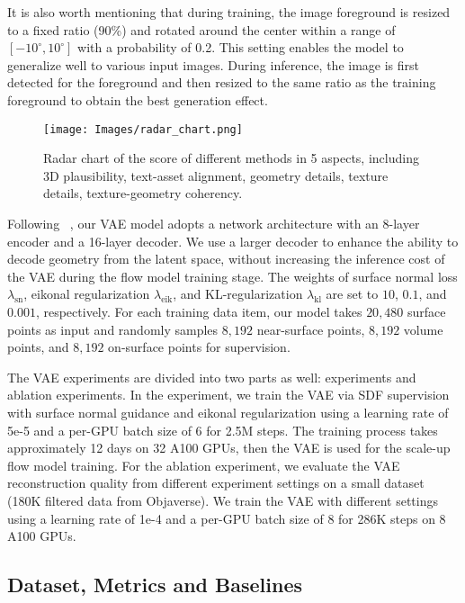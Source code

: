 It is also worth mentioning that during training, the image foreground is resized to a fixed ratio (90\%) and rotated around the center within a range of $[-10^\circ, 10^\circ]$ with a probability of 0.2. This setting enables the model to generalize well to various input images. During inference, the image is first detected for the foreground and then resized to the same ratio as the training foreground to obtain the best generation effect.

\begin{figure}[t]
    \centering
    \texttt{[image: Images/radar\_chart.png]}
    \caption{Radar chart of the score of different methods in 5 aspects, including 3D plausibility, text-asset alignment, geometry details, texture details, texture-geometry coherency.}
    \label{fig:gpteval}
    \vspace{-1em}
\end{figure}


Following ~\cite{zhao2024michelangelo}, our VAE model adopts a network architecture with an 8-layer encoder and a 16-layer decoder. We use a larger decoder to enhance the ability to decode geometry from the latent space, without increasing the inference cost of the VAE during the flow model training stage.
The weights of surface normal loss $\lambda_{\text{sn}}$, eikonal regularization $\lambda_{\text{eik}}$, and KL-regularization $\lambda_{\text{kl}}$ are set to $10$, $0.1$, and $0.001$, respectively.
For each training data item, our model takes $20,480$ surface points as input and randomly samples $8,192$ near-surface points, $8,192$ volume points, and $8,192$ on-surface points for supervision.

The VAE experiments are divided into two parts as well: \method{} experiments and ablation experiments.
In the \method{} experiment, we train the VAE via SDF supervision with surface normal guidance and eikonal regularization using a learning rate of 5e-5 and a per-GPU batch size of 6 for 2.5M steps. The training process takes approximately 12 days on 32 A100 GPUs, then the VAE is used for the scale-up flow model training.
For the ablation experiment, we evaluate the VAE reconstruction quality from different experiment settings on a small dataset (180K filtered data from Objaverse). We train the VAE with different settings using a learning rate of 1e-4 and a per-GPU batch size of 8 for 286K steps on 8 A100 GPUs.


\subsection{Dataset, Metrics and Baselines}

